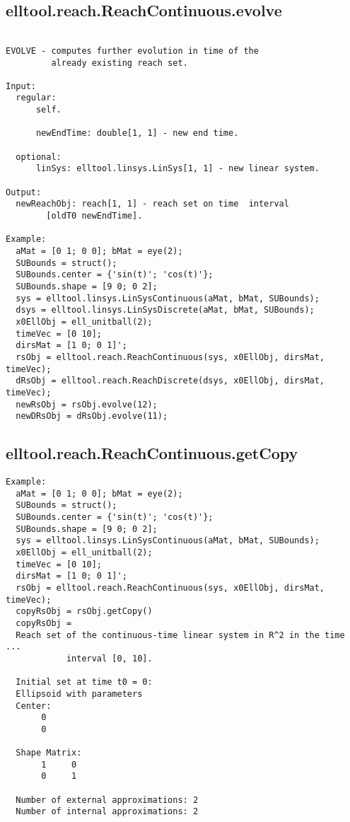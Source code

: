 \subsection{\texorpdfstring{elltool.reach.ReachContinuous.evolve}{evolve}}\label{method:elltool.reach.ReachContinuous.evolve}
\begin{verbatim}

EVOLVE - computes further evolution in time of the
         already existing reach set.

Input:
  regular:
      self.

      newEndTime: double[1, 1] - new end time.

  optional:
      linSys: elltool.linsys.LinSys[1, 1] - new linear system.

Output:
  newReachObj: reach[1, 1] - reach set on time  interval
        [oldT0 newEndTime].

Example:
  aMat = [0 1; 0 0]; bMat = eye(2);
  SUBounds = struct();
  SUBounds.center = {'sin(t)'; 'cos(t)'};
  SUBounds.shape = [9 0; 0 2];
  sys = elltool.linsys.LinSysContinuous(aMat, bMat, SUBounds);
  dsys = elltool.linsys.LinSysDiscrete(aMat, bMat, SUBounds);
  x0EllObj = ell_unitball(2);
  timeVec = [0 10];
  dirsMat = [1 0; 0 1]';
  rsObj = elltool.reach.ReachContinuous(sys, x0EllObj, dirsMat, timeVec);
  dRsObj = elltool.reach.ReachDiscrete(dsys, x0EllObj, dirsMat, timeVec);
  newRsObj = rsObj.evolve(12);
  newDRsObj = dRsObj.evolve(11);
\end{verbatim}
\subsection{\texorpdfstring{elltool.reach.ReachContinuous.getCopy}{getCopy}}\label{method:elltool.reach.ReachContinuous.getCopy}
\begin{verbatim}
Example:
  aMat = [0 1; 0 0]; bMat = eye(2);
  SUBounds = struct();
  SUBounds.center = {'sin(t)'; 'cos(t)'};
  SUBounds.shape = [9 0; 0 2];
  sys = elltool.linsys.LinSysContinuous(aMat, bMat, SUBounds);
  x0EllObj = ell_unitball(2);
  timeVec = [0 10];
  dirsMat = [1 0; 0 1]';
  rsObj = elltool.reach.ReachContinuous(sys, x0EllObj, dirsMat, timeVec);
  copyRsObj = rsObj.getCopy()
  copyRsObj =
  Reach set of the continuous-time linear system in R^2 in the time ...
            interval [0, 10].

  Initial set at time t0 = 0:
  Ellipsoid with parameters
  Center:
       0
       0

  Shape Matrix:
       1     0
       0     1

  Number of external approximations: 2
  Number of internal approximations: 2
\end{verbatim}

